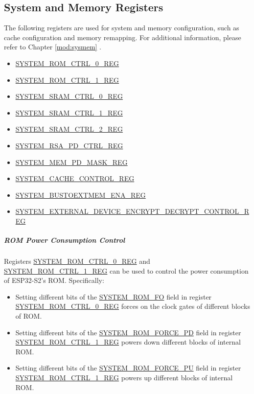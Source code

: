 \documentclass[main\_\_EN.tex]{subfiles}
\begin{document}
\subsection{System and Memory Registers}

The following registers are used for system and memory configuration, such as cache configuration and memory remapping. For additional information, please refer to Chapter \ref{mod:sysmem} \textit{}.

\begin{itemize}
    \item \hyperref[regdesc:SYSTEMROMCTRL0REG]{SYSTEM\_ROM\_CTRL\_0\_REG}
    \item \hyperref[regdesc:SYSTEMROMCTRL1REG]{SYSTEM\_ROM\_CTRL\_1\_REG}
    \item \hyperref[regdesc:SYSTEMSRAMCTRL0REG]{SYSTEM\_SRAM\_CTRL\_0\_REG}
    \item \hyperref[regdesc:SYSTEMSRAMCTRL1REG]{SYSTEM\_SRAM\_CTRL\_1\_REG}
    \item \hyperref[regdesc:SYSTEMSRAMCTRL2REG]{SYSTEM\_SRAM\_CTRL\_2\_REG}
    \item \hyperref[regdesc:SYSTEMRSAPDCTRLREG]{SYSTEM\_RSA\_PD\_CTRL\_REG}
    \item \hyperref[regdesc:SYSTEMMEMPDMASKREG]{SYSTEM\_MEM\_PD\_MASK\_REG}
    \item \hyperref[regdesc:SYSTEMCACHECONTROLREG]{SYSTEM\_CACHE\_CONTROL\_REG}
    \item \hyperref[regdesc:SYSTEMBUSTOEXTMEMENAREG]{SYSTEM\_BUSTOEXTMEM\_ENA\_REG}
    \item \hyperref[regdesc:SYSTEMEXTERNALDEVICEENCRYPTDECRYPTCONTROLREG]{SYSTEM\_EXTERNAL\_DEVICE\_ENCRYPT\_DECRYPT\_CONTROL\_REG}
\end{itemize}

\subparagraph{ROM Power Consumption Control}

Registers \hyperref[regdesc:SYSTEMROMCTRL0REG]{SYSTEM\_ROM\_CTRL\_0\_REG} and  \hyperref[regdesc:SYSTEMROMCTRL1REG]{SYSTEM\_ROM\_CTRL\_1\_REG} can be used to control the power consumption of ESP32-S2's ROM. Specifically:

\begin{itemize}
    \item Setting different bits of the \hyperref[fielddesc:SYSTEMROMFO]{SYSTEM\_ROM\_FO} field in register \hyperref[regdesc:SYSTEMROMCTRL0REG]{SYSTEM\_ROM\_CTRL\_0\_REG} forces on the clock gates of different blocks of ROM.
    \item Setting different bits of the \hyperref[fielddesc:SYSTEMROMFORCEPD]{SYSTEM\_ROM\_FORCE\_PD} field in register \hyperref[regdesc:SYSTEMROMCTRL1REG]{SYSTEM\_ROM\_CTRL\_1\_REG} powers down different blocks of internal ROM.
    \item Setting different bits of the \hyperref[fielddesc:SYSTEMROMFORCEPU]{SYSTEM\_ROM\_FORCE\_PU} field in register \hyperref[regdesc:SYSTEMROMCTRL1REG]{SYSTEM\_ROM\_CTRL\_1\_REG} powers up different blocks of internal ROM.
\end{itemize}
\end{document}
